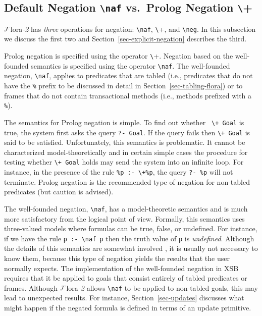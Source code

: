 \documentclass[11pt]{article}
\newcommand{\FLORA}{{\mbox{\sc ${\cal F}${lora}\rm\emph{-2}}}\xspace}
\newcommand{\FLSYSTEM}{\FLORA}
\newcommand{\bs}{\textbackslash}
\newcommand{\PLGNAF}{\mbox{\texttt{\bs}+}\xspace}
\newcommand{\RULELOGNAF}{{\texttt{{\bs}naf}}\xspace}
\newcommand{\RULELOGNEG}{{\texttt{{\bs}neg}}\xspace}
\begin{document}
\subsection{Default Negation \RULELOGNAF  vs.~Prolog Negation \PLGNAF}\label{sec-negation}
\index{\RULELOGNAF}
\index{\PLGNAF}
\FLSYSTEM has \emph{three} operations for negation: \RULELOGNAF, \PLGNAF, and {\tt \RULELOGNEG}.
In this subsection we discuss the first two and
Section~\ref{sec-explicit-negation} describes the third.

Prolog negation is specified using the operator \PLGNAF.
Negation based on the well-founded semantics is specified using the
operator \RULELOGNAF.  The well-founded negation, \RULELOGNAF, applies to predicates
that are tabled (i.e., predicates that do not have the {\tt \%} prefix
to be discussed in detail in Section~\ref{sec-tabling-flora}) or
to frames that do not contain transactional methods (i.e., methods
prefixed with a {\tt \%}).

The semantics for Prolog negation is simple. To find out whether {\tt
  \PLGNAF Goal} is true, the system first asks the query {\tt ?- Goal}. If the query
fails then {\tt \PLGNAF Goal} is said to be satisfied. Unfortunately, this
semantics is problematic. It cannot be characterized model-theoretically
and in certain simple cases the procedure for testing whether {\tt \PLGNAF
  Goal}
holds may send the system into an infinite loop. For instance, in the
presence of the rule {\tt \%p :- \PLGNAF \%p}, the query {\tt ?- \%p} will not
terminate.  Prolog negation is the recommended type of negation for
non-tabled predicates (but caution is advised).

The well-founded negation, \RULELOGNAF, has a model-theoretic semantics and is
much more
satisfactory from the logical point of view.
Formally, this semantics uses three-valued models where formulas can be
true, false, or undefined. For instance, if we have the rule
{\tt p :- \RULELOGNAF p} then the truth value of {\tt p} is \emph{undefined}.  
Although the details of this
semantics are somewhat involved \cite{gelder-ross-schlipf-91}, it is
usually not necessary to know them, because this type of negation yields
the results that the user normally expects. The implementation of
the well-founded negation in XSB requires that it be applied to goals that
consist entirely of tabled predicates or frames.
Although \FLSYSTEM allows \RULELOGNAF to be applied to non-tabled goals,
this may lead to unexpected results.  For instance, 
Section~\ref{sec-updates} discusses what might happen if the
negated formula is defined in terms of an update primitive.
\end{document}
